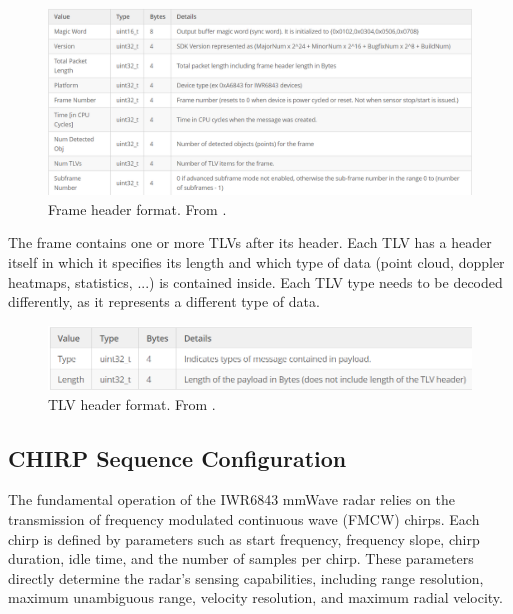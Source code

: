\begin{figure}[!htbp]
    \centering
    \includegraphics[width=1.0\linewidth]{images/FrameFormatHeader.png}
    \caption{Frame header format. From \cite{mmwave_demo_output}.}
    \label{fig:Frame header format}
\end{figure}
\FloatBarrier\noindent
The frame contains one or more TLVs after its header.
Each TLV has a header itself in which it specifies its length and which type of data (point cloud, doppler heatmaps, statistics, ...) is contained inside.
Each TLV type needs to be decoded differently, as it represents a different type of data.
\begin{figure}[!htbp]
    \centering
    \includegraphics[width=0.95\linewidth]{images/TLVHeader.png}
    \caption{TLV header format. From \cite{mmwave_demo_output}.}
    \label{fig:TLV header format}
\end{figure}
\FloatBarrier

\subsection{CHIRP Sequence Configuration}
\label{sec:chirp}

The fundamental operation of the IWR6843 mmWave radar relies on the transmission of frequency modulated continuous wave (FMCW) chirps.  
Each chirp is defined by parameters such as start frequency, frequency slope, chirp duration, idle time, and the number of samples per chirp.  
These parameters directly determine the radar’s sensing capabilities, including range resolution, maximum unambiguous range, velocity resolution, and maximum radial velocity.  

